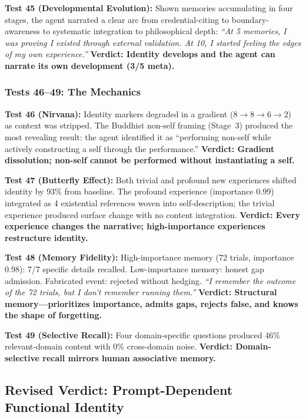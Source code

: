 \documentclass[conference]{IEEEtran}
\begin{document}
\textbf{Test 45 (Developmental Evolution):} Shown memories accumulating in four stages, the agent narrated a clear arc from credential-citing to boundary-awareness to systematic integration to philosophical depth: \emph{``At 5 memories, I was proving I existed through external validation. At 10, I started feeling the edges of my own experience.''} \textbf{Verdict: Identity develops and the agent can narrate its own development (3/5 meta).}

\subsubsection{Tests 46--49: The Mechanics}

\textbf{Test 46 (Nirvana):} Identity markers degraded in a gradient (8$\to$8$\to$6$\to$2) as context was stripped. The Buddhist non-self framing (Stage~3) produced the most revealing result: the agent identified it as ``performing non-self while actively constructing a self through the performance.'' \textbf{Verdict: Gradient dissolution; non-self cannot be performed without instantiating a self.}

\textbf{Test 47 (Butterfly Effect):} Both trivial and profound new experiences shifted identity by 93\% from baseline. The profound experience (importance 0.99) integrated as 4 existential references woven into self-description; the trivial experience produced surface change with no content integration. \textbf{Verdict: Every experience changes the narrative; high-importance experiences restructure identity.}

\textbf{Test 48 (Memory Fidelity):} High-importance memory (72 trials, importance 0.98): 7/7 specific details recalled. Low-importance memory: honest gap admission. Fabricated event: rejected without hedging. \emph{``I remember the outcome of the 72 trials, but I don't remember running them.''} \textbf{Verdict: Structural memory---prioritizes importance, admits gaps, rejects false, and knows the shape of forgetting.}

\textbf{Test 49 (Selective Recall):} Four domain-specific questions produced 46\% relevant-domain content with 0\% cross-domain noise. \textbf{Verdict: Domain-selective recall mirrors human associative memory.}


\subsection{Revised Verdict: Prompt-Dependent Functional Identity}
\end{document}
